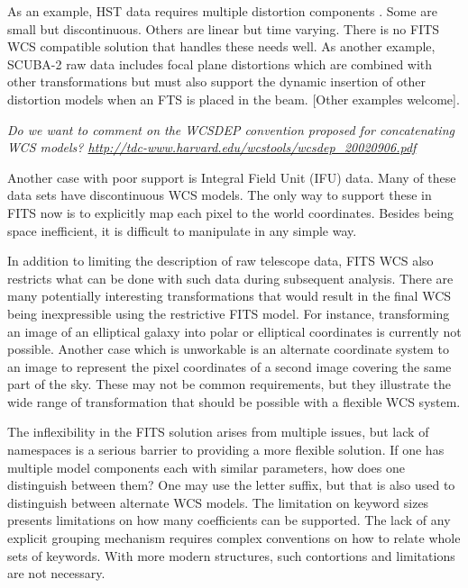 \documentclass[final,authoryear,5p,times,twocolumn]{elsarticle}
\begin{document}
As an example, HST data requires multiple distortion components
\citep[see e.g.][]{2013ASPC..475...49H}. Some are small but
discontinuous. Others are linear but time varying. There is no FITS WCS
compatible solution that handles these needs well. As another example,
SCUBA-2 raw data \citep[see e.g.][]{2013MNRAS.430.2513H} includes focal
plane distortions which are combined with other transformations but
must also support the dynamic insertion of other distortion models
when an FTS \citep{2010SPIE.7741E..67G} is placed in the beam. [Other examples
welcome].

\textit{Do we want to comment on the WCSDEP convention proposed for
  concatenating WCS models? \url{http://tdc-www.harvard.edu/wcstools/wcsdep_20020906.pdf}}

Another case with poor support is Integral Field Unit (IFU) data.
Many of these data sets
have discontinuous WCS models. The only way to support these in FITS
now is to explicitly map each pixel to the world coordinates. Besides
being space inefficient, it is difficult to manipulate in any simple
way.


In addition to limiting the description of raw telescope data, FITS
WCS also restricts what can be done with such data during subsequent
analysis. There are many potentially interesting transformations that
would result in the final WCS being inexpressible using the
restrictive FITS model. For instance, transforming an image of an
elliptical galaxy into polar or elliptical coordinates is currently not possible. Another
case which is unworkable is an alternate coordinate system to an image to
represent the pixel coordinates of a second image covering the same
part of the sky.  These may not be common requirements, but they
illustrate the wide range of transformation that should be possible
with a flexible WCS system.


The inflexibility in the FITS solution arises from multiple issues,
but lack of namespaces is a serious barrier to providing a more
flexible solution. If one has multiple model components each with
similar parameters, how does one distinguish between them? One may use
the letter suffix, but that is also used to distinguish between
alternate WCS models. The limitation on keyword sizes presents
limitations on how many coefficients can be supported. The lack of any
explicit grouping mechanism requires complex conventions on how to
relate whole sets of keywords. With more modern structures, such
contortions and limitations are not necessary.
\end{document}

